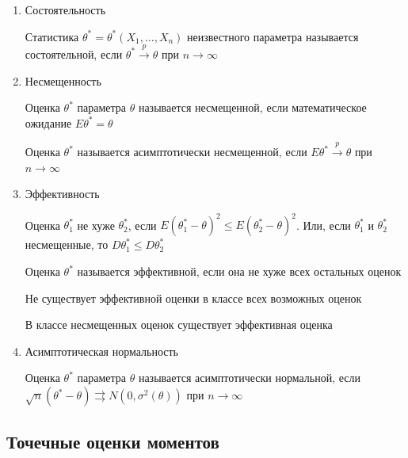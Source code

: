 \documentclass[12pt]{article}
\begin{document}
\begin{enumerate}
    \item Состоятельность

    \Defs Статистика $\theta^* = \theta^*(X_1, \dots, X_n)$ неизвестного параметра называется
    состоятельной, если $\theta^* \overset{p}{\longrightarrow} \theta$ при $n \to \infty$

    \mediumvspace

    \item Несмещенность

    \Defs Оценка $\theta^*$ параметра $\theta$ называется несмещенной, если 
    математическое ожидание $E \theta^* = \theta$
    
    \Notas Оценка $\theta^*$ называется асимптотически несмещенной, если 
    $E \theta^* \overset{p}{\longrightarrow} \theta$ при $n \to \infty$

    \mediumvspace

    \item Эффективность 

    \Defs Оценка $\theta^*_1$ не хуже $\theta^*_2$, если $E (\theta^*_1 - \theta)^2 \leq E (\theta^*_2 - \theta)^2$.
    Или, если $\theta^*_1$ и $\theta^*_2$ несмещенные, то $D \theta^*_1 \leq D \theta^*_2$

    \Defs Оценка $\theta^*$ называется эффективной, если она не хуже всех остальных оценок

    \Notas Не существует эффективной оценки в классе всех возможных оценок

    \begin{MyTheorem}
        \Ths В классе несмещенных оценок существует эффективная оценка
    \end{MyTheorem}

    \mediumvspace

    \item Асимптотическая нормальность

    \Defs Оценка $\theta^*$ параметра $\theta$ называется асимптотически нормальной, если 
    $\sqrt{n} (\theta^* - \theta) \rightrightarrows N(0, \sigma^2 (\theta))$ при $n \to \infty$
    
\end{enumerate}

\subsection{Точечные оценки моментов}

\hypertarget{moments_point_estimation}{}
\end{document}
